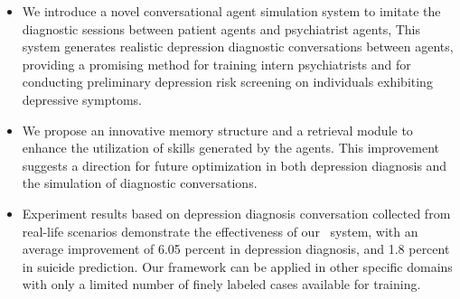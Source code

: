 \begin{itemize}
    \item We introduce a novel conversational agent simulation system to imitate the diagnostic sessions between patient agents and psychiatrist agents, This system generates realistic depression diagnostic conversations between agents, providing a promising method for training intern psychiatrists and for conducting preliminary depression risk screening on individuals exhibiting depressive symptoms.
    \item We propose an innovative memory structure and a retrieval module to enhance the utilization of skills generated by the agents. This improvement suggests a direction for future optimization in both depression diagnosis and the simulation of diagnostic conversations.
    \item Experiment results based on depression diagnosis conversation collected from real-life scenarios demonstrate the effectiveness of our \system~system, with an average improvement of 6.05 percent in depression diagnosis, and 1.8 percent in suicide prediction. Our framework can be applied in other specific domains with only a limited number of finely labeled cases available for training.
    
\end{itemize}

